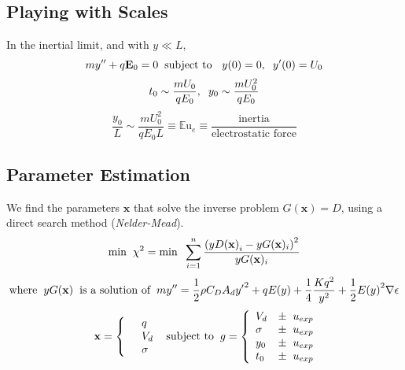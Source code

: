 \documentclass[10pt,a4paper]{article}
\author{Erin Schmidt}
\begin{document}
\subsection*{Playing with Scales}
In the inertial limit, and with $y \ll L$,
\[ m y'' + q \mathbf{E}_0 = 0 \hspace{2 mm} \mbox{subject to } \hspace{2 mm} y(0) = 0, \hspace{2 mm} y'(0) = U_0 \] 
\[ t_0 \sim \frac{m U_0}{q E_0}, \hspace{2 mm} y_0 \sim \frac{m U_0^2}{q E_0}\]
\[\frac{y_0}{L} \sim \frac{m U_0^2}{q E_0 L} \equiv {\mathbb{E}\mbox{u}}_e \equiv \frac{\mbox{inertia}}{\mbox{electrostatic force}}\]

\newpage
\subsection*{Parameter Estimation}
We find the parameters $\mathbf{x}$ that solve the inverse problem $G(\mathbf{x}) = D$, using a direct search method (\emph{Nelder-Mead}). 
\begin{equation*}
\mbox{min} \hspace{2 mm} \chi^2 = \mbox{min} \hspace{2 mm} \sum^n_{i=1} \frac{\left({yD(\mathbf{x})}_i - yG(\mathbf{x})_i \right)^2}{yG(\mathbf{x})_i}
\end{equation*}
\[\mbox{where} \hspace{2 mm} yG(\mathbf{x}) \hspace{2 mm} \mbox{is a solution of} \hspace{2 mm} m y'' = \frac{1}{2} \rho C_D A_d {y'}^2 + q E(y) + \frac{1}{4} \frac{K q^2}{y^2} + \frac{1}{2} {E(y)}^2 \nabla \epsilon\]
\begin{eqnarray*} \mbox{} \hspace{2 mm} \begin{split} \mathbf{x} = \left\{ \begin{array}{ll}      & q\\
		  &	V_d\\
          & \sigma 
          \end{array} \right. 
          \end{split} \hspace{2 mm} \mbox{subject to} \hspace{2 mm} \begin{split}
          g = \left\{ \begin{array}{ll}
           V_d &\pm \hspace{2 mm} u_{exp}\\
      	   \sigma &\pm  \hspace{2 mm} u_{exp}\\
      	   y_0 &\pm \hspace{2 mm} u_{exp}\\
      	   t_0 &\pm \hspace{2 mm} u_{exp}\\
          \end{array} \right. 
          \end{split}
\end{eqnarray*}
\end{document}
